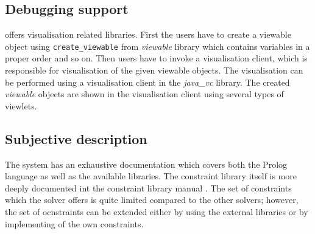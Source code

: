 \subsection{Debugging support}
\eclipse offers visualisation related libraries. First the users have to create a 
viewable object using \texttt{create\_viewable} from {\em viewable} library which 
contains variables in a proper order and so on. Then
users have to invoke a visualisation client, which is responsible for visualisation of the 
given viewable objects. The visualisation can be performed using a visualisation client
in the {\em java\_vc} library. The created {\em viewable} objects are shown in
the visualisation client using several types of viewlets.  


\subsection{Subjective description}
The \eclipse system has an exhaustive documentation \cite{eclipse:tutorial} which covers both the Prolog language
as well as the available libraries. The constraint library itself is more deeply documented
int the constraint library manual \cite{eclipse:cspmanual}. The set of constraints which the solver offers
is quite limited compared to the other solvers; however, the set of ocnstraints can be extended 
either by using the external libraries or by implementing of the own constraints.

 